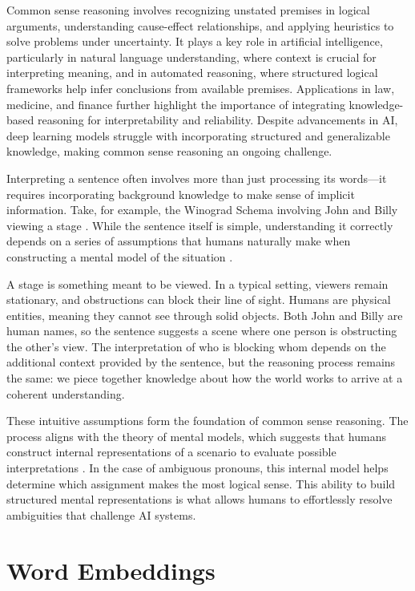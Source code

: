 \documentclass[english,version-2020-11]{uzl-thesis}
\begin{document}
Common sense reasoning involves recognizing unstated premises in logical arguments, understanding cause-effect relationships, and applying heuristics to solve problems under uncertainty. It plays a key role in artificial intelligence, particularly in natural language understanding, where context is crucial for interpreting meaning, and in automated reasoning, where structured logical frameworks help infer conclusions from available premises. Applications in law, medicine, and finance further highlight the importance of integrating knowledge-based reasoning for interpretability and reliability. Despite advancements in AI, deep learning models struggle with incorporating structured and generalizable knowledge, making common sense reasoning an ongoing challenge.

Interpreting a sentence often involves more than just processing its words—it requires incorporating background knowledge to make sense of implicit information. Take, for example, the Winograd Schema involving John and Billy viewing a stage \cite{Levesque2012}. While the sentence itself is simple, understanding it correctly depends on a series of assumptions that humans naturally make when constructing a mental model of the situation \cite{Bayerkuhnlein2023}.

A stage is something meant to be viewed. In a typical setting, viewers remain stationary, and obstructions can block their line of sight. Humans are physical entities, meaning they cannot see through solid objects. Both John and Billy are human names, so the sentence suggests a scene where one person is obstructing the other’s view. The interpretation of who is blocking whom depends on the additional context provided by the sentence, but the reasoning process remains the same: we piece together knowledge about how the world works to arrive at a coherent understanding.

These intuitive assumptions form the foundation of common sense reasoning. The process aligns with the theory of mental models, which suggests that humans construct internal representations of a scenario to evaluate possible interpretations \cite{JohnsonLaird1989}. In the case of ambiguous pronouns, this internal model helps determine which assignment makes the most logical sense. This ability to build structured mental representations is what allows humans to effortlessly resolve ambiguities that challenge AI systems.

\section{Word Embeddings}
\end{document}
